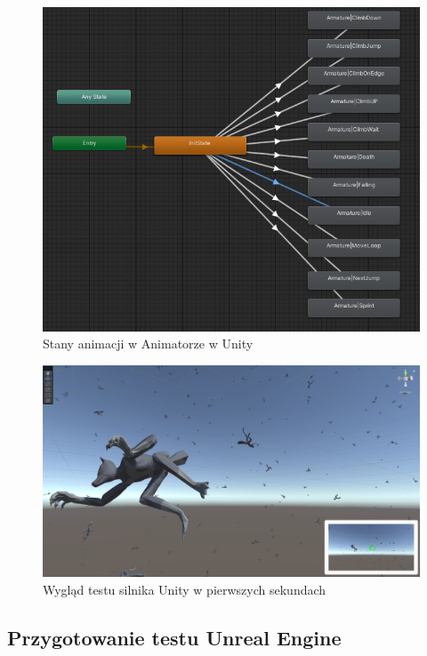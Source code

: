 \documentclass[12pt,twoside]{article}
\begin{document}
\begin{figure}[h]
    \centering
    \includegraphics[width=16cm]{figures/UnityAnimation.png}
    \caption{Stany animacji w Animatorze w Unity}
    \label{Fig:UnityAnimation}
\end{figure}     
\clearpage
\begin{figure}[H]
    \centering
    \includegraphics[width=16cm]{figures/UnityLupa.png}
    \caption{Wygląd testu silnika Unity w pierwszych sekundach }
    \label{Fig:TESTUnityScreen}
\end{figure}     


\subsection{Przygotowanie testu Unreal Engine}
\end{document}
